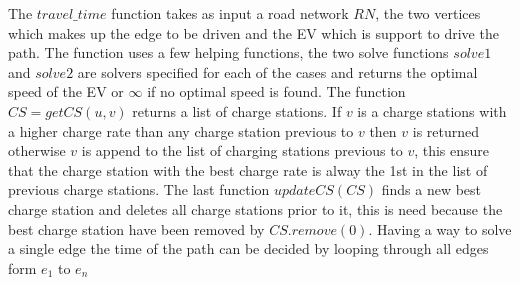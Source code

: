 The $travel\_time$ function takes as input a road network $RN$, the two vertices which makes up the edge to be driven and the EV which is support to drive the path. The function uses a few helping functions, the two solve functions $solve1$ and $solve2$ are solvers specified for each of the cases and returns the optimal speed of the EV or $\infty$ if no optimal speed is found. The function $CS = getCS(u, v)$ returns a list of charge stations. If $v$ is a charge stations with a higher charge rate than any charge station previous to $v$ then $v$ is returned otherwise $v$ is append to the list of charging stations previous to $v$, this ensure that the charge station with the best charge rate is alway the 1st in the list of previous charge stations. The last function $updateCS(CS)$ finds a new best charge station and deletes all charge stations prior to it, this is need because the best charge station have been removed by $CS.remove(0)$. Having a way to solve a single edge the time of the path can be decided by looping through all edges form $e_1$ to $e_n$  
